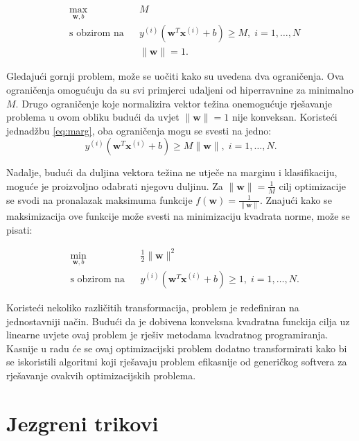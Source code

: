 \documentclass[times, utf8, zavrsni, numeric]{fer}
\begin{document}
\begin{equation}
\begin{aligned}
& \underset{\mathbf{w}, b}{\text{max}}
& & M \\
& \text{s obzirom na}
& & y^{(i)}(\mathbf{w}^T\mathbf{x}^{(i)} + b) \geq M, \; i = 1, \ldots, N \\
&&& \|\mathbf{w}\|=1.
\end{aligned}
\end{equation}

\par Gledajući gornji problem, može se uočiti kako su uvedena dva ograničenja. 
Ova ograničenja omogućuju da su svi primjerci udaljeni od hiperravnine za minimalno $M$.
Drugo ograničenje koje normalizira vektor težina onemogućuje rješavanje problema u ovom obliku budući da
uvjet $\|\mathbf{w}\|=1$ nije konveksan. Koristeći jednadžbu \ref{eq:marg}, oba ograničenja mogu se svesti
na jedno: 
\begin{equation*}
  y^{(i)}(\mathbf{w}^T\mathbf{x}^{(i)} + b) \geq M\|\mathbf{w}\|, \; i = 1, \ldots, N.
\end{equation*}

Nadalje, budući da duljina vektora težina ne utječe na marginu i klasifikaciju, moguće je proizvoljno odabrati
njegovu duljinu.
Za $\|\mathbf{w}\|=\frac{1}{M}$ cilj optimizacije se svodi na pronalazak maksimuma funkcije 
$f(\mathbf{w}) = \frac{1}{\|\mathbf{w}\|}$. Znajući kako se maksimizacija ove funkcije može svesti na 
minimizaciju kvadrata norme, može se pisati:

\begin{equation}
\begin{aligned}
& \underset{\mathbf{w}, b}{\text{min}}
& & \frac{1}{2}\|\mathbf{w}\|^2 \\
& \text{s obzirom na}
& & y^{(i)}(\mathbf{w}^T\mathbf{x}^{(i)} + b) \geq 1, \; i = 1, \ldots, N.
\end{aligned}
\end{equation}

\par Koristeći nekoliko različitih transformacija, problem je redefiniran na jednostavniji način.
Budući da je dobivena konveksna kvadratna funckija cilja uz linearne uvjete ovaj problem je rješiv
metodama kvadratnog programiranja. Kasnije u radu će se ovaj optimizacijski problem dodatno transformirati
kako bi se iskoristili algoritmi koji rješavaju problem efikasnije od generičkog softvera za 
rješavanje ovakvih optimizacijskih problema. 

\section{Jezgreni trikovi} \label{jezgra}
\end{document}
